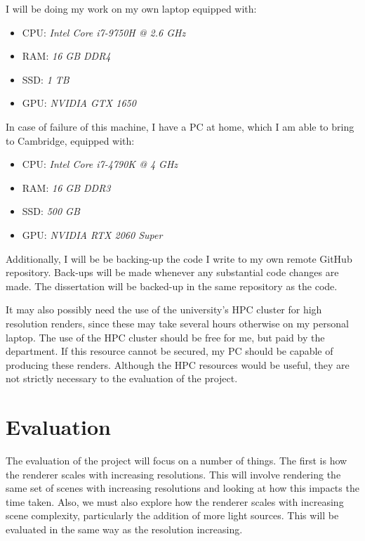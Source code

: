 \documentclass[12pt, a4paper]{article}
\begin{document}
    I will be doing my work on my own laptop equipped with:
    \begin{itemize}
        \setlength\itemsep{0.1em}
        \item CPU: \emph{Intel Core i7-9750H @ 2.6 GHz}
        \item RAM: \emph{16 GB DDR4}
        \item SSD: \emph{1 TB}
        \item GPU: \emph{NVIDIA GTX 1650}
    \end{itemize}
    
    In case of failure of this machine, I have a PC at home, which I am able to bring to Cambridge, equipped with:
    \begin{itemize}
        \setlength\itemsep{0.1em}
        \item CPU: \emph{Intel Core i7-4790K @ 4 GHz}
        \item RAM: \emph{16 GB DDR3}
        \item SSD: \emph{500 GB}
        \item GPU: \emph{NVIDIA RTX 2060 Super}
    \end{itemize}

    Additionally, I will be be backing-up the code I write to my own remote GitHub repository. Back-ups will be made whenever any substantial code changes are made. The dissertation will be backed-up in the same repository as the code.

    It may also possibly need the use of the university’s HPC cluster for high resolution renders, since these may take several hours otherwise on my personal laptop. The use of the HPC cluster should be free for me, but paid by the department. If this resource cannot be secured, my PC should be capable of producing these renders. Although the HPC resources would be useful, they are not strictly necessary to the evaluation of the project.

    \section*{Evaluation}
    The evaluation of the project will focus on a number of things. The first is how the renderer scales with increasing resolutions. This will involve rendering the same set of scenes with increasing resolutions and looking at how this impacts the time taken. Also, we must also explore how the renderer scales with increasing scene complexity, particularly the addition of more light sources. This will be evaluated in the same way as the resolution increasing.
\end{document}
